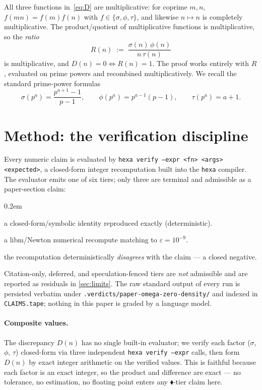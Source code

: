 \documentclass[11pt,a4paper]{article}
\newcommand{\sig}{\sigma}
\newcommand{\formal}{\textcolor{blue!60!black}{$\blacklozenge$}}
\newcommand{\falsi}{\textcolor{red!70!black}{$\blacksquare$}}
\theoremstyle{plain}
\theoremstyle{definition}
\begin{document}
All three functions in~\eqref{eq:D} are multiplicative: for coprime $m,n$,
$f(mn)=f(m)f(n)$ with $f\in\{\sig,\phi,\tau\}$, and likewise $n\mapsto n$ is
completely multiplicative. The product/quotient of multiplicative functions is
multiplicative, so the \emph{ratio}
\begin{equation}
  R(n) \;:=\; \frac{\sig(n)\,\phi(n)}{n\,\tau(n)}
  \label{eq:R}
\end{equation}
is multiplicative, and $D(n)=0 \iff R(n)=1$. The proof works entirely with $R$,
evaluated on prime powers and recombined multiplicatively. We recall the
standard prime-power formulas
\[
  \sig(p^a)=\frac{p^{a+1}-1}{p-1},\qquad
  \phi(p^a)=p^{a-1}(p-1),\qquad
  \tau(p^a)=a+1 .
\]

\section{Method: the verification discipline}
\label{sec:method}

Every numeric claim is evaluated by \texttt{hexa verify --expr <fn> <args>
<expected>}, a closed-form integer recomputation built into the \texttt{hexa}
compiler. The evaluator emits one of six tiers; only three are terminal and
admissible as a paper-section claim:
\begin{description}\itemsep0.2em
\item[\formal\,\textsc{formal}] a closed-form/symbolic identity reproduced exactly (deterministic).
\item[\textcolor{green!50!black}{$\bullet$}\,\textsc{numerical}] a libm/Newton numerical recompute matching to $\varepsilon=10^{-9}$.
\item[\falsi\,\textsc{falsified}] the recomputation deterministically \emph{disagrees} with the claim --- a closed negative.
\end{description}
Citation-only, deferred, and speculation-fenced tiers are \emph{not} admissible
and are reported as residuals in \textsection\ref{sec:limits}. The raw standard
output of every run is persisted verbatim under
\texttt{.verdicts/paper-omega-zero-density/} and indexed in
\texttt{CLAIMS.tape}; nothing in this paper is graded by a language model.

\paragraph{Composite values.} The discrepancy $D(n)$ has no single built-in
evaluator; we verify each factor ($\sig$, $\phi$, $\tau$) closed-form via three
independent \texttt{hexa verify --expr} calls, then form $D(n)$ by exact
integer arithmetic on the verified values. This is faithful because each factor
is an exact integer, so the product and difference are exact --- no tolerance,
no estimation, no floating point enters any \formal-tier claim here.
\end{document}
